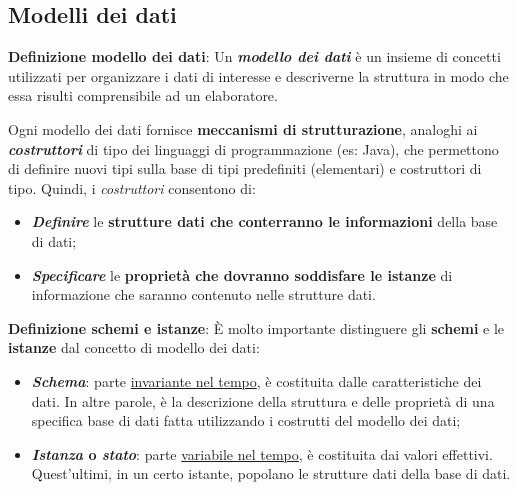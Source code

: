 \documentclass[a4paper]{article}
\begin{document}
	\newpage
	
	
	
	
	\subsection{Modelli dei dati}
	\textcolor{Red3}{\textbf{Definizione modello dei dati}}: Un \textbf{\emph{modello dei dati}} è un insieme di concetti utilizzati per organizzare i dati di interesse e descriverne la struttura in modo che essa risulti comprensibile ad un elaboratore.
	
	Ogni modello dei dati fornisce \textbf{meccanismi di strutturazione}, analoghi ai \textbf{\emph{costruttori}} di tipo dei linguaggi di programmazione (es: Java), che permettono di definire nuovi tipi sulla base di tipi predefiniti (elementari) e costruttori di tipo. Quindi, i \emph{costruttori} consentono di:
	
	\begin{itemize}
		\item[\ding{43}] \textbf{\emph{Definire}} le \textbf{strutture dati che conterranno le informazioni} della base di dati;
		\item[\ding{43}] \textbf{\emph{Specificare}} le \textbf{proprietà che dovranno soddisfare le istanze} di informazione che saranno contenuto nelle strutture dati.
	\end{itemize}

	\noindent \newline
	\textcolor{Red3}{\textbf{Definizione schemi e istanze}}: È molto importante distinguere gli \textbf{schemi} e le \textbf{istanze} dal concetto di modello dei dati:
	
	\begin{itemize}
		\item \textbf{\emph{Schema}}: parte \underline{invariante nel tempo}, è costituita dalle caratteristiche dei dati. In altre parole, è la descrizione della struttura e delle proprietà di una specifica base di dati fatta utilizzando i costrutti del modello dei dati;
		\item \textbf{\emph{Istanza} o \emph{stato}}: parte \underline{variabile nel tempo}, è costituita dai valori effettivi. Quest'ultimi, in un certo istante, popolano le strutture dati della base di dati.
	\end{itemize}
\end{document}
